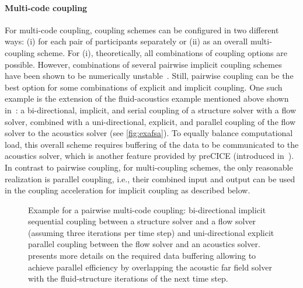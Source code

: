 \paragraph{Multi-code coupling} 
For multi-code coupling, coupling schemes can be configured in two different ways: (i) for each pair of participants separately or (ii) as an overall multi-coupling scheme. For (i), theoretically, all combinations of coupling options are possible. However, combinations of several pairwise implicit coupling schemes have been shown to be numerically unstable~\cite{Bungartz2014_MIQN_CompuMech}. Still, pairwise coupling can be the best option for some combinations of explicit and implicit coupling. One such example is the extension of the fluid-acoustics example mentioned above shown in~\cite{Lindner2020_ExaFSA}: a bi-directional, implicit, and serial coupling of a structure solver with a flow solver, combined with a uni-directional, explicit, and parallel coupling of the flow solver to the acoustics solver (see \autoref{fig:exafsa}). To equally balance computational load, this overall scheme requires buffering of the data to be communicated to the acoustics solver, which is another feature provided by preCICE (introduced in~\cite{Lindner2020_ExaFSA}). In contrast to pairwise coupling, for multi-coupling schemes, the only reasonable realization is parallel coupling, i.e., their combined input and output can be used in the coupling acceleration for implicit coupling as described below.

\begin{figure}[h!]
  \centering
  \begin{minipage}{0.48\textwidth}
  
    \end{minipage}
    \hfill
  \begin{minipage}{0.48\textwidth}
    
    \end{minipage}
  \caption{
    \label{fig:exafsa} Example for a pairwise multi-code coupling: bi-directional implicit sequential coupling between a structure solver and a flow solver (assuming three iterations per time step) and uni-directional explicit parallel coupling between the flow solver and an acoustics solver.~\cite{Lindner2020_ExaFSA} presents more details on the required data buffering allowing to achieve parallel efficiency by overlapping the acoustic far field solver with the fluid-structure iterations of the next time step.}
\end{figure}

